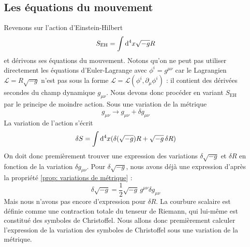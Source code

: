 \subsection{Les équations du mouvement}
Revenons sur l'action d'Einstein-Hilbert
\begin{equation}
    S_{\text{EH}} = \int \mathrm{d} ^4x \sqrt{-g}R
    \label{eq:action d'Einstein-Hilbert 2}
\end{equation}
et dérivons ses équations du mouvement. Notons qu'on ne peut pas utiliser directement les équations d'Euler-Lagrange avec $\phi^{i} = g^{\mu \nu}$ car le Lagrangien $\mathcal{L} = R\sqrt{-g}$ n'est pas sous la forme $\mathcal{L} = \mathcal{L}(\phi^{i}, \partial_{\mu} \phi^{i})$ : il contient des dérivées secondes du champ dynamique $g_{\mu \nu}$. Nous devons donc procéder en variant $S_{\text{EH}}$ par le principe de moindre action. Sous une variation de la métrique
\begin{equation}
    g_{\mu \nu} \rightarrow g_{\mu \nu} + \delta g_{\mu \nu}
\end{equation}
La variation de l'action s'écrit
\begin{equation}
    \delta S = \int \mathrm{d} ^4x (\delta (\sqrt{-g})R + \sqrt{-g}\,\delta R)
\end{equation}
On doit donc premièrement trouver une expression des variations $\delta \sqrt{-g}$ et $\delta R$ en fonction de la variation $ \delta g_{\mu\nu}$. Pour $\delta \sqrt{-g}$, nous avons déjà une expression d'après la propriété \ref{prop: variations de métrique} :
\begin{equation}
    \delta \sqrt{-g} = \frac{1}{2} \sqrt{-g} \,g^{\mu\nu} \delta g_{\mu\nu}
\end{equation}
Mais nous n'avons pas encore d'expression pour $\delta R$. La courbure scalaire est définie comme une contraction totale du tenseur de Riemann, qui lui-même est constitué des symboles de Christoffel. Nous allons donc premièrement calculer l'expression de la variation des symboles de Christoffel sous une variation de la métrique.


